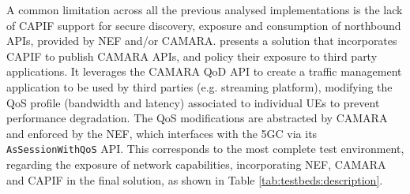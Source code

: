 A common limitation across all the previous analysed implementations is the lack of \acs{CAPIF} support for secure discovery, exposure and consumption of northbound \acsp{API}, provided by \acs{NEF} and/or CAMARA. \cite{PathwayNaaSCAMARA} presents a solution that incorporates \acs{CAPIF} to publish CAMARA \acsp{API}, and policy their exposure to third party applications. It leverages the CAMARA \acs{QoD} \acs{API} to create a traffic management application to be used by third parties (e.g. streaming platform), modifying the \acs{QoS} profile (bandwidth and latency) associated to individual \acsp{UE} to prevent performance degradation. The \acs{QoS} modifications are abstracted by CAMARA and enforced by the \acs{NEF}, which interfaces with the \acs{5GC} via its \texttt{AsSessionWithQoS} \acs{API}. This corresponds to the most complete test environment, regarding the exposure of network capabilities, incorporating \acs{NEF}, CAMARA and \acs{CAPIF} in the final solution, as shown in Table \ref{tab:testbeds:description}.

